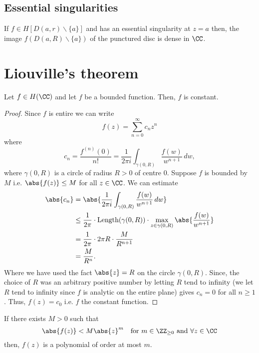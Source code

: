 \documentclass[12pt, a4paper]{article}
\begin{document}
\subsection{Essential singularities}

\begin{mdthm}
    If \(f \in H[D(a,r) \backslash \{a\}]\) and has an essential singularity at \(z=a\) then, the image \(f(D(a,R) \backslash \{a\})\) of the punctured disc is dense in \(\CC\).
\end{mdthm}

\section{Liouville's theorem}

\begin{mdthm}
    Let \(f \in H(\CC)\) and let \(f\) be a bounded function. Then, \(f\) is constant.
\end{mdthm}

\begin{proof}
    Since \(f\) is entire we can write 
    \[f(z) = \sum_{n=0}^{\infty} c_n z^n\]
    where 
    \[c_n = \frac{f^{(n)}(0)}{n!} =\frac{1}{2\pi i} \int_{\gamma(0,R)} \frac{f(w)}{w^{n+1}} \, dw,\]
    where \(\gamma(0,R)\) is a circle of radius \(R>0\) of centre \(0\). Suppose \(f\) is bounded by \(M\) i.e. \(\abs{f(z)} \leq M\) for all \(z \in \CC\). We can estimate 
    \[\begin{aligned}
        \abs{c_n} &= \abs{\frac{1}{2\pi i} \int_{\gamma(0,R)} \frac{f(w)}{w^{n+1}} \, dw} \\
        &\leq \frac{1}{2\pi} \cdot \text{Length}(\gamma(0,R)) \cdot \max_{z \in \gamma(0,R)} \abs{\frac{f(w)}{w^{n+1}}} \\
        &= \frac{1}{2\pi} \cdot 2\pi R \cdot \frac{M}{R^{n+1}} \\
        &= \frac{M}{R^n}.
    \end{aligned}\]
    Where we have used the fact \(\abs{z}=R\) on the circle \(\gamma(0,R)\). Since, the choice of \(R\) was an arbitrary positive number by letting \(R\) tend to infinity (we let \(R\) tend to infinity since \(f\) is analytic on the entire plane) gives \(c_n = 0\) for all \(n \geq 1\). Thus, \(f(z) = c_0\) i.e. \(f\) the constant function.
\end{proof}

\begin{mdcor}
    If there exists \(M >0\) such that 
    \[\abs{f(z)} < M\abs{z}^m \quad \text{for } m\in \ZZ_{\geq 0} \text{ and } \forall z \in \CC\]
    then, \(f(z)\) is a polynomial of order at most \(m\).
\end{mdcor}
\end{document}
